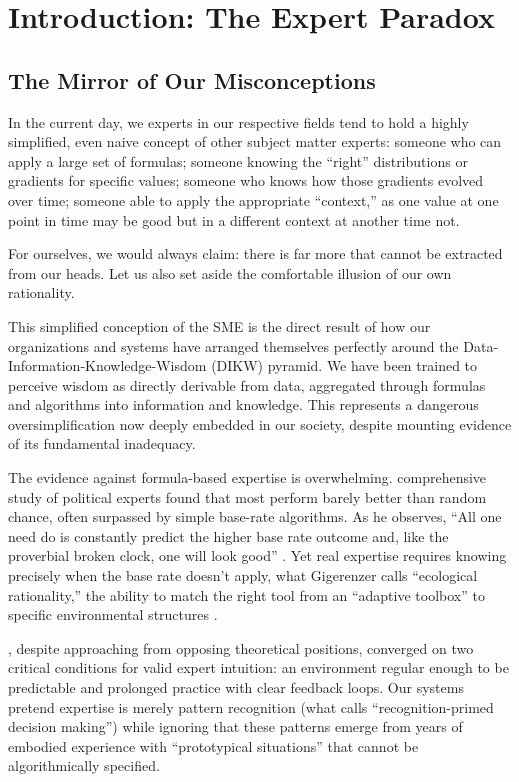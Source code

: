 \section{Introduction: The Expert Paradox}

\subsection{The Mirror of Our Misconceptions}

In the current day, we experts in our respective fields tend to hold a highly simplified, even naive concept of other subject matter experts: someone who can apply a large set of formulas; someone knowing the ``right'' distributions or gradients for specific values; someone who knows how those gradients evolved over time; someone able to apply the appropriate ``context,'' as one value at one point in time may be good but in a different context at another time not.

For ourselves, we would always claim: there is far more that cannot be extracted from our heads. Let us also set aside the comfortable illusion of our own rationality.

This simplified conception of the SME is the direct result of how our organizations and systems have arranged themselves perfectly around the Data-Information-Knowledge-Wisdom (DIKW) pyramid. We have been trained to perceive wisdom as directly derivable from data, aggregated through formulas and algorithms into information and knowledge. This represents a dangerous oversimplification now deeply embedded in our society, despite mounting evidence of its fundamental inadequacy.

The evidence against formula-based expertise is overwhelming. \citet{tetlock2005} comprehensive study of political experts found that most perform barely better than random chance, often surpassed by simple base-rate algorithms. As he observes, ``All one need do is constantly predict the higher base rate outcome and, like the proverbial broken clock, one will look good'' \citep{tetlock2005}. Yet real expertise requires knowing precisely when the base rate doesn't apply, what Gigerenzer calls ``ecological rationality,'' the ability to match the right tool from an ``adaptive toolbox'' to specific environmental structures \citep{gigerenzer2001}.

\citet{kahneman2009}, despite approaching from opposing theoretical positions, converged on two critical conditions for valid expert intuition: an environment regular enough to be predictable and prolonged practice with clear feedback loops. Our systems pretend expertise is merely pattern recognition (what \citet{klein1993} calls ``recognition-primed decision making'') while ignoring that these patterns emerge from years of embodied experience with ``prototypical situations'' that cannot be algorithmically specified.

